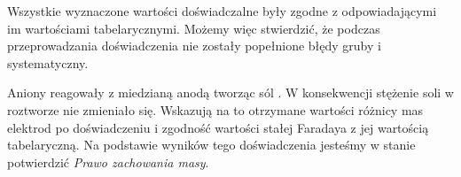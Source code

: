 \documentclass[12pt,a4paper]{article}
\numberwithin{equation}{section}
\begin{document}
Wszystkie wyznaczone wartości doświadczalne były zgodne z odpowiadającymi im wartościami tabelarycznymi. Możemy więc stwierdzić, że podczas przeprowadzania doświadczenia nie zostały popełnione błędy gruby i systematyczny.

Aniony  reagowały z miedzianą anodą tworząc sól . W konsekwencji stężenie soli w roztworze nie zmieniało się. Wskazują na to otrzymane wartości różnicy mas elektrod po doświadczeniu i zgodność wartości stałej Faradaya z jej wartością tabelaryczną. Na podstawie wyników tego doświadczenia jesteśmy w stanie potwierdzić \textit{Prawo zachowania masy}.
\end{document}
